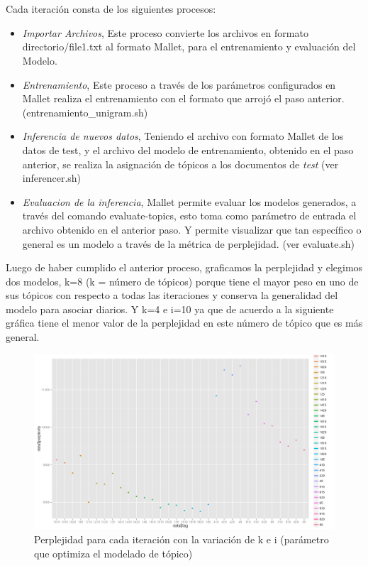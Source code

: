 \documentclass[8.5pt,twoside,twocolumn]{article}
\begin{document}
\\
\\
Cada iteraci\'on consta de los siguientes procesos:
\begin{itemize}
\item \emph{Importar Archivos},
            Este proceso convierte los archivos 
            en formato directorio/file1.txt  al formato Mallet, para el 
            entrenamiento y evaluaci\'on del Modelo. 
\item \emph{Entrenamiento},
            Este proceso a trav\'es de los par\'ametros 
            configurados en Mallet realiza el entrenamiento 
            con el formato que arroj\'o el paso anterior. (entrenamiento\_unigram.sh)
\item \emph{Inferencia de nuevos datos},
            Teniendo el archivo con formato Mallet de los datos de test, 
            y el archivo del modelo de entrenamiento, obtenido en el paso anterior, 
            se realiza la asignaci\'on de t\'opicos a los documentos de \emph{test} (ver inferencer.sh)
            
\item \emph{Evaluacion de la inferencia},
            Mallet permite evaluar los modelos generados, a trav\'es del comando 
            evaluate-topics, esto toma como par\'ametro de entrada el archivo obtenido en 
            el anterior paso. Y permite visualizar que tan espec\'ifico o general es un modelo
            a trav\'es de la m\'etrica de perplejidad. (ver evaluate.sh)
\end{itemize}

Luego de haber cumplido el anterior proceso, graficamos la perplejidad y
 elegimos dos modelos, k=8 (k = n\'umero de t\'opicos) porque tiene  el mayor peso en uno de sus 
t\'opicos con respecto a todas las iteraciones y conserva la generalidad del modelo para asociar diarios.
 Y k=4 e i=10 ya que de acuerdo a la siguiente
 gr\'afica tiene el menor valor de la perplejidad en este n\'umero de t\'opico que es  m\'as general.

\begin{figure}[h]
  \centering
  \includegraphics[scale=0.2]{perplexity.png}
  \caption{Perplejidad para cada iteraci\'on con la variaci\'on de k e i (par\'ametro que optimiza el modelado de t\'opico) } 
  \label{fgr:perplexity}
\end{figure}
\end{document}
